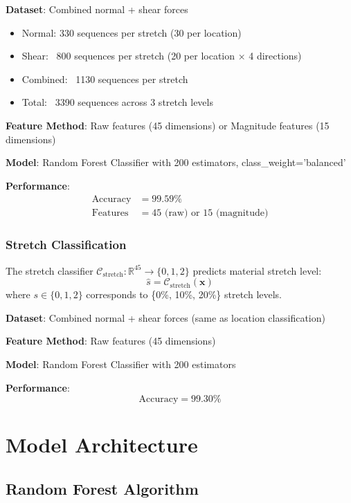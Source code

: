 \documentclass[11pt,a4paper]{article}
\begin{document}
\textbf{Dataset}: Combined normal + shear forces
\begin{itemize}
    \item Normal: 330 sequences per stretch (30 per location)
    \item Shear: ~800 sequences per stretch (20 per location × 4 directions)
    \item Combined: ~1130 sequences per stretch
    \item Total: ~3390 sequences across 3 stretch levels
\end{itemize}

\textbf{Feature Method}: Raw features (45 dimensions) or Magnitude features (15 dimensions)

\textbf{Model}: Random Forest Classifier with 200 estimators, class\_weight='balanced'

\textbf{Performance}:
\begin{align}
\text{Accuracy} &= 99.59\% \\
\text{Features} &= 45 \text{ (raw)} \text{ or } 15 \text{ (magnitude)}
\end{align}

\subsubsection{Stretch Classification}

The stretch classifier $\mathcal{C}_{\text{stretch}}: \mathbb{R}^{45} \rightarrow \{0, 1, 2\}$ predicts material stretch level:
\begin{equation}
\hat{s} = \mathcal{C}_{\text{stretch}}(\mathbf{x})
\end{equation}
where $s \in \{0, 1, 2\}$ corresponds to \{0\%, 10\%, 20\%\} stretch levels.

\textbf{Dataset}: Combined normal + shear forces (same as location classification)

\textbf{Feature Method}: Raw features (45 dimensions)

\textbf{Model}: Random Forest Classifier with 200 estimators

\textbf{Performance}:
\begin{equation}
\text{Accuracy} = 99.30\%
\end{equation}

\section{Model Architecture}

\subsection{Random Forest Algorithm}
\end{document}
